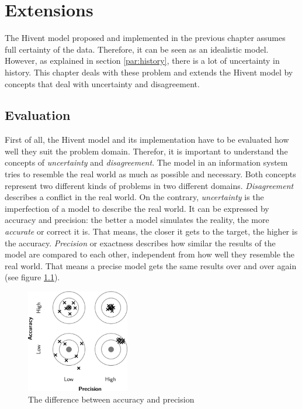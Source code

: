 
\chapter{Extensions} %
\label{cha:extensions}

\vspace{-1em}
The Hivent model proposed and implemented in the previous chapter assumes full certainty of the data. Therefore, it can be seen as an idealistic model. However, as explained in section \ref{par:history}, there is a lot of uncertainty in history. This chapter deals with these problem and extends the Hivent model by concepts that deal with uncertainty and disagreement.

\section{Evaluation} %
\label{sec:evaluation}

First of all, the Hivent model and its implementation have to be evaluated how well they suit the problem domain. Therefor, it is important to understand the concepts of \emph{uncertainty} and \emph{disagreement}. The model in an information system tries to resemble the real world as much as possible and necessary. Both concepts represent two different kinds of problems in two different domains.
\emph{Disagreement} describes a conflict in the real world. On the contrary, \emph{uncertainty} is the imperfection of a model to describe the real world. It can be expressed by accuracy and precision: the better a model simulates the reality, the more \emph{accurate} or correct it is. That means, the closer it gets to the target, the higher is the accuracy. \emph{Precision} or exactness describes how similar the results of the model are compared to each other, independent from how well they resemble the real world. That means a precise model gets the same results over and over again (see figure \ref{fig:accuracy_precision}).

\begin{figure}[ht]
  \centering
  \includegraphics[width=0.4\textwidth]{graphics/extensions/accuracy_precision}
  \caption{The difference between accuracy and precision}
  \label{fig:accuracy_precision}
\end{figure}


